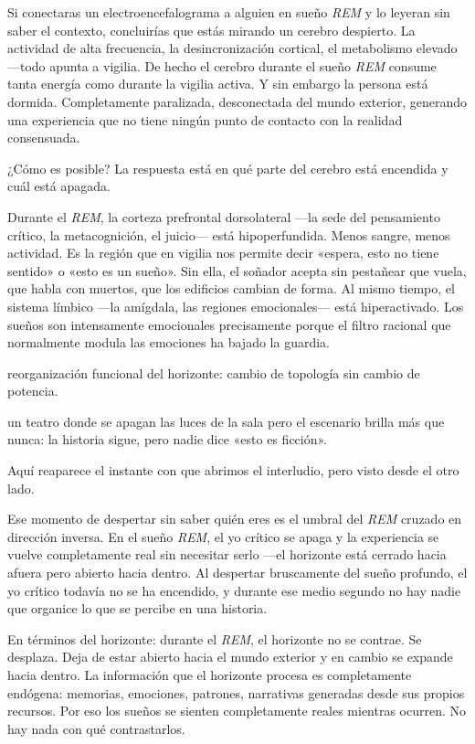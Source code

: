 \noindent Si conectaras un electroencefalograma a alguien en sueño \emph{REM} y lo leyeran sin saber el contexto, concluirías que estás mirando un cerebro despierto. La actividad de alta frecuencia, la desincronización cortical, el metabolismo elevado —todo apunta a vigilia. De hecho el cerebro durante el sueño \emph{REM} consume tanta energía como durante la vigilia activa. Y sin embargo la persona está dormida. Completamente paralizada, desconectada del mundo exterior, generando una experiencia que no tiene ningún punto de contacto con la realidad consensuada.

¿Cómo es posible? La respuesta está en qué parte del cerebro está encendida y cuál está apagada.

Durante el \emph{REM}, la corteza prefrontal dorsolateral —la sede del pensamiento crítico, la metacognición, el juicio— está hipoperfundida. Menos sangre, menos actividad. Es la región que en vigilia nos permite decir «espera, esto no tiene sentido» o «esto es un sueño». Sin ella, el soñador acepta sin pestañear que vuela, que habla con muertos, que los edificios cambian de forma. Al mismo tiempo, el sistema límbico —la amígdala, las regiones emocionales— está hiperactivado. Los sueños son intensamente emocionales precisamente porque el filtro racional que normalmente modula las emociones ha bajado la guardia.

\begin{fisica}
 reorganización funcional del horizonte: cambio de topología sin cambio de potencia.

 un teatro donde se apagan las luces de la sala pero el escenario brilla más que nunca: la historia sigue, pero nadie dice «esto es ficción».
\end{fisica}
Aquí reaparece el instante con que abrimos el interludio, pero visto desde el otro lado.

Ese momento de despertar sin saber quién eres es el umbral del \emph{REM} cruzado en dirección inversa. En el sueño \emph{REM}, el yo crítico se apaga y la experiencia se vuelve completamente real sin necesitar serlo —el horizonte está cerrado hacia afuera pero abierto hacia dentro. Al despertar bruscamente del sueño profundo, el yo crítico todavía no se ha encendido, y durante ese medio segundo no hay nadie que organice lo que se percibe en una historia.

En términos del horizonte: durante el \emph{REM}, el horizonte no se contrae. Se desplaza. Deja de estar abierto hacia el mundo exterior y en cambio se expande hacia dentro. La información que el horizonte procesa es completamente endógena: memorias, emociones, patrones, narrativas generadas desde sus propios recursos. Por eso los sueños se sienten completamente reales mientras ocurren. No hay nada con qué contrastarlos.

